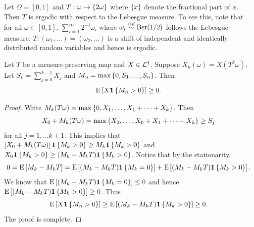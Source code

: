\begin{example}
    Let $\Omega = [0,1]$ and $T:\omega\mapsto\left\{ {2\omega} \right\}$ where $\left\{ {x} \right\}$ 
    denote the fractional part of $x$. Then $T$ is ergodic with respect 
    to the Lebesgue measure. To see this, note that for all $\omega\in[0,1]$, 
    $\sum_{i=1}^\infty2^{-i}\omega_i$ where $\omega_i\overset{iid}{\sim}\text{Ber}(1/2)$ 
    follows the Lebesgue measure. $T:(\omega_1,\ldots) = (\omega_2,\ldots)$ 
    is a shift of independent and identically distributed random variables 
    and hence is ergodic. 
\end{example}

\begin{lemma}
    Let $T$ be a measure-preserving map and $X\in\mathcal{L}^1$. Suppose $X_k(\omega) 
    = X(T^k\omega)$. Let $S_k = \sum_{j=0}^{k-1}X_j$ and $M_n = 
    \max\left\{ {0,S_1\ldots,S_n} \right\}$. Then 
    \begin{equation*}
        \operatorname{E}\left[ {X\mathbf{1}\left\{ {M_n>0} \right\}} \right] \geq 0. 
    \end{equation*}
\end{lemma}
\begin{proof}
    Write $M_k(T\omega) = \max\left\{ {0,X_1,\ldots,X_1+\cdots+X_k} \right\}$. 
    Then 
    \begin{equation*}
        X_0 + M_k(T\omega) = \max\left\{ {X_0,\ldots,X_0+X_1+\cdots+X_k} \right\}\geq S_j
    \end{equation*} 
    for all $j = 1,\ldots k+1$. This implies that 
    $\left[ {X_0 + M_k(T\omega)} \right]\mathbf{1}\left\{ {M_k>0} \right\}\geq M_k\mathbf{1}\left\{ {M_k>0} \right\}$ 
    and $X_0\mathbf{1}\left\{ {M_k>0} \right\}\geq (M_k - M_kT)\mathbf{1}\left\{ {M_k>0} \right\}$. Notice that 
    by the stationarity, 
    \begin{equation*}
        0 = \operatorname{E}\left[ {M_k - M_kT} \right] = \operatorname{E}\left[ {(M_k - M_kT)\mathbf{1}\left\{ {M_k=0} \right\}} \right] 
        + \operatorname{E}\left[ {(M_k - M_kT)\mathbf{1}\left\{ {M_k>0} \right\}} \right]. 
    \end{equation*}
    We know that $\operatorname{E}\left[ {(M_k - M_kT)\mathbf{1}\left\{ {M_k=0} \right\}} \right] \leq 0$ and hence 
    $\operatorname{E}\left[ {(M_k - M_kT)\mathbf{1}\left\{ {M_k>0} \right\}} \right]\geq 0$. Thus 
    \begin{equation*}
        \operatorname{E}\left[ {X\mathbf{1}\left\{ {M_n>0} \right\}} \right]\geq \operatorname{E}\left[ {(M_k - M_kT)\mathbf{1}\left\{ {M_k>0} \right\}} \right]\geq 0.
    \end{equation*}
    The proof is complete. 
\end{proof}

